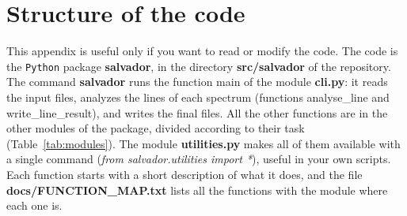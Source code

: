 \documentclass[modern]{aastex701}
\begin{document}
\section{Structure of the code} \label{appendix_c}
This appendix is useful only if you want to read or modify the code. The code is the \texttt{Python} package {\bf salvador}, in the directory {\bf src/salvador} of the repository. The command {\bf salvador} runs the function main of the module {\bf cli.py}: it reads the input files, analyzes the lines of each spectrum (functions analyse\_line and write\_line\_result), and writes the final files. All the other functions are in the other modules of the package, divided according to their task (Table~\ref{tab:modules}). The module {\bf utilities.py} makes all of them available with a single command ({\it from salvador.utilities import *}), useful in your own scripts. Each function starts with a short description of what it does, and the file {\bf docs/FUNCTION\_MAP.txt} lists all the functions with the module where each one is. 
\end{document}
